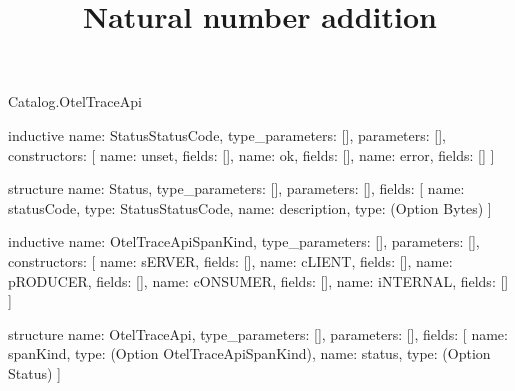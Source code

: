 \begin{lexlean}{Catalog.OtelTraceApi}
\title{Natural number addition}
\begin{semanticmodule}
inductive{
  name: StatusStatusCode,
  type_parameters: [],
  parameters: [],
  constructors: [
    {name: unset, fields: []},
    {name: ok, fields: []},
    {name: error, fields: []}
  ]
}

structure{
  name: Status,
  type_parameters: [],
  parameters: [],
  fields: [
    {name: statusCode, type: StatusStatusCode},
    {name: description, type: (Option Bytes)}
  ]
}

inductive{
  name: OtelTraceApiSpanKind,
  type_parameters: [],
  parameters: [],
  constructors: [
    {name: sERVER, fields: []},
    {name: cLIENT, fields: []},
    {name: pRODUCER, fields: []},
    {name: cONSUMER, fields: []},
    {name: iNTERNAL, fields: []}
  ]
}

structure{
  name: OtelTraceApi,
  type_parameters: [],
  parameters: [],
  fields: [
    {name: spanKind, type: (Option OtelTraceApiSpanKind)},
    {name: status, type: (Option Status)}
  ]
}
\end{semanticmodule}
\end{lexlean}
